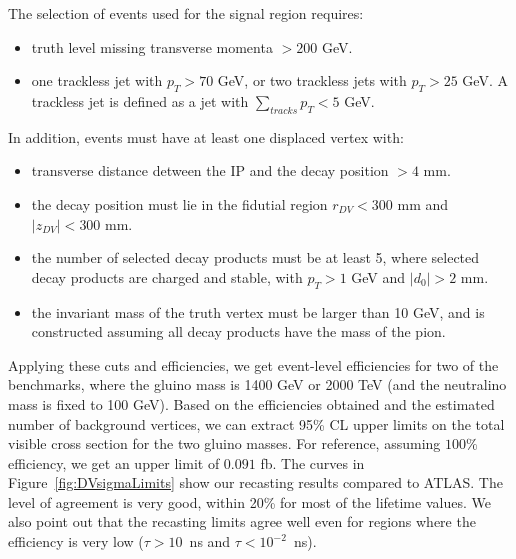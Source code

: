 The selection of events used for the signal region requires:

\begin{itemize}
\item{truth level missing transverse momenta $>200$ GeV.}
\item{one trackless jet with $p_{T}>70$ GeV, or two trackless jets with $p_{T}>25$ GeV. A trackless jet is defined as a jet with $\sum_{tracks} p_{T}<5$ GeV.}
\end{itemize}

In addition, events must have at least one displaced vertex with:

\begin{itemize}
\item{transverse distance detween the IP and the decay position $>4$ mm.}
\item{the decay position must lie in the fidutial region $r_{DV}<300$ mm and $|z_{DV}|<300$ mm.}
\item{the number of selected decay products must be at least 5, where selected decay products are charged and stable, with $p_{T}>1$ GeV and $|d_{0}|>2$ mm.}
\item{the invariant mass of the truth vertex must be larger than 10 GeV, and is constructed assuming all decay products have the mass of the pion.}
\end{itemize}

Applying these cuts and efficiencies, we get event-level efficiencies for two of
the benchmarks, where the gluino mass is 1400 GeV or 2000 TeV (and the
neutralino mass is fixed to 100 GeV). Based on the efficiencies obtained and the
estimated number of background vertices, we can extract 95\% CL upper limits on
the total visible cross section for the two gluino masses. For reference,
assuming $100\%$ efficiency, we get an upper limit of $0.091$ fb. The
curves in Figure~\ref{fig:DVsigmaLimits} show our recasting results compared to
ATLAS. The level of agreement is very good, within 20\% for most of the
lifetime values. We also point out that the recasting limits agree well
even for regions where the efficiency is very low ($\tau > 10$~ns
and $\tau < 10^{-2}$~ns).


